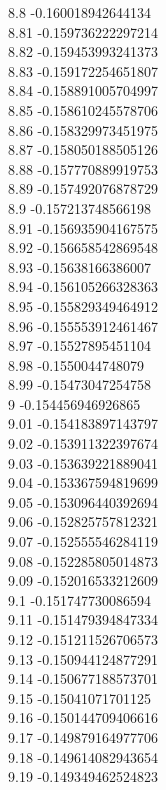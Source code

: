 {8.8	-0.160018942644134\\
8.81	-0.159736222297214\\
8.82	-0.159453993241373\\
8.83	-0.159172254651807\\
8.84	-0.158891005704997\\
8.85	-0.158610245578706\\
8.86	-0.158329973451975\\
8.87	-0.158050188505126\\
8.88	-0.157770889919753\\
8.89	-0.157492076878729\\
8.9	-0.157213748566198\\
8.91	-0.156935904167575\\
8.92	-0.156658542869548\\
8.93	-0.15638166386007\\
8.94	-0.156105266328363\\
8.95	-0.155829349464912\\
8.96	-0.155553912461467\\
8.97	-0.15527895451104\\
8.98	-0.1550044748079\\
8.99	-0.15473047254758\\
9	-0.154456946926865\\
9.01	-0.154183897143797\\
9.02	-0.153911322397674\\
9.03	-0.153639221889041\\
9.04	-0.153367594819699\\
9.05	-0.153096440392694\\
9.06	-0.152825757812321\\
9.07	-0.152555546284119\\
9.08	-0.152285805014873\\
9.09	-0.152016533212609\\
9.1	-0.151747730086594\\
9.11	-0.151479394847334\\
9.12	-0.151211526706573\\
9.13	-0.150944124877291\\
9.14	-0.150677188573701\\
9.15	-0.15041071701125\\
9.16	-0.150144709406616\\
9.17	-0.149879164977706\\
9.18	-0.149614082943654\\
9.19	-0.149349462524823\\
}
